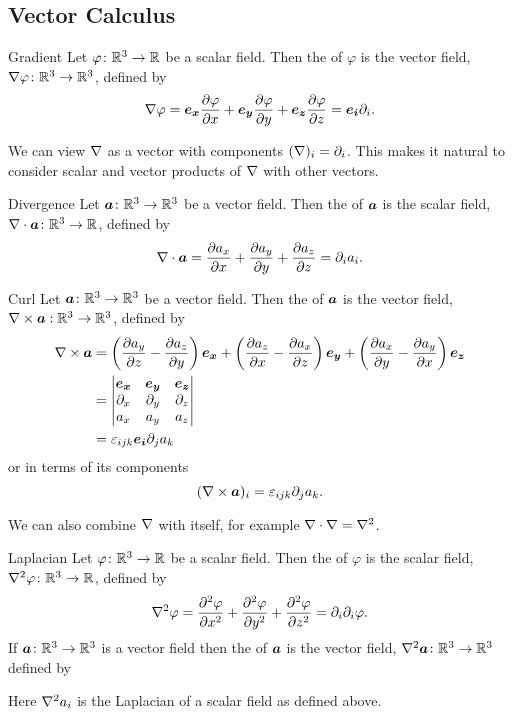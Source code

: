 \documentclass[a4paper]{article}
\begin{document}
    \subsection{Vector Calculus}
    \begin{definition}{Gradient}{}
        Let \(\varphi\colon\mathbb{R}^3\to\mathbb{R}\) be a scalar field.
        Then the  of \(\varphi\) is the vector field, \(\nabla\varphi\colon\mathbb{R}^3\to\mathbb{R}^3\), defined by
        \[\nabla\varphi = \bm{e_{x}}\pdv{\varphi}{x} + \bm{e_{y}}\pdv{\varphi}{y} + \bm{e_{z}}\pdv{\varphi}{z} = \bm{e_{i}}\partial_i.\]
    \end{definition}
    We can view \(\nabla\) as a vector with components \((\nabla)_i = \partial_i\).
    This makes it natural to consider scalar and vector products of \(\nabla\) with other vectors.
    \begin{definition}{Divergence}{}
        Let \(\bm{a}\colon\mathbb{R}^3\to\mathbb{R}^3\) be a vector field.
        Then the  of \(\bm{a}\) is the scalar field, \(\nabla\cdot\bm{a}\colon\mathbb{R}^3\to\mathbb{R}\), defined by
        \[\nabla\cdot\bm{a} = \pdv{a_x}{x} + \pdv{a_y}{y} + \pdv{a_z}{z} = \partial_ia_i.\]
    \end{definition}
    \begin{definition}{Curl}{}
        Let \(\bm{a}\colon\mathbb{R}^3\to\mathbb{R}^3\) be a vector field.
        Then the  of \(\bm{a}\) is the vector field, \(\nabla\times\bm{a}:\mathbb{R}^3\to\mathbb{R}^3\), defined by
        \begin{align*}
            \nabla\times\bm{a} &= \left(\pdv{a_y}{z} - \pdv{a_z}{y}\right)\bm{e_{x}} + \left(\pdv{a_z}{x} - \pdv{a_x}{z}\right)\bm{e_{y}} + \left(\pdv{a_x}{y} - \pdv{a_y}{x}\right)\bm{e_{z}}\\
            &= 
            \begin{vmatrix}
                \bm{e_{x}} & \bm{e_{y}} & \bm{e_{z}}\\
                \partial_x & \partial_y & \partial_z\\
                a_x & a_y & a_z
            \end{vmatrix}
            \\
            &= \varepsilon_{ijk}\bm{e_{i}}\partial_ja_k
        \end{align*}
        or in terms of its components
        \[(\nabla\times\bm{a})_i = \varepsilon_{ijk}\partial_ja_k.\]
    \end{definition}
    We can also combine \(\nabla\) with itself, for example \(\nabla\cdot\nabla = \nabla^2\).
    \begin{definition}{Laplacian}{}
        Let \(\varphi\colon\mathbb{R}^3\to\mathbb{R}\) be a scalar field.
        Then the  of \(\varphi\) is the scalar field, \(\nabla^2\varphi\colon\mathbb{R}^3\to\mathbb{R}\), defined by
        \[\nabla^2\varphi = \pdv[2]{\varphi}{x} + \pdv[2]{\varphi}{y} + \pdv[2]{\varphi}{z} = \partial_i\partial_i\varphi.\]
        If \(\bm{a}\colon\mathbb{R}^3\to\mathbb{R}^3\) is a vector field then the  of \(\bm{a}\) is the vector field, \(\nabla^2\bm{a}\colon\mathbb{R}^3\to\mathbb{R}^3\) defined by

        Here \(\nabla^2 a_i\) is the Laplacian of a scalar field as defined above.
    \end{definition}
\end{document}
